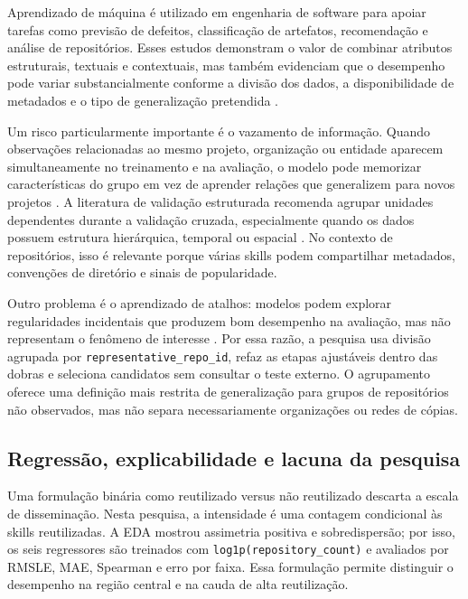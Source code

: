 Aprendizado de máquina é utilizado em engenharia de software para apoiar
tarefas como previsão de defeitos, classificação de artefatos,
recomendação e análise de repositórios. Esses estudos demonstram o valor
de combinar atributos estruturais, textuais e contextuais, mas também
evidenciam que o desempenho pode variar substancialmente conforme a
divisão dos dados, a disponibilidade de metadados e o tipo de
generalização pretendida \cite{menzies2010defect}.

Um risco particularmente importante é o vazamento de informação. Quando
observações relacionadas ao mesmo projeto, organização ou entidade
aparecem simultaneamente no treinamento e na avaliação, o modelo pode
memorizar características do grupo em vez de aprender relações que
generalizem para novos projetos \cite{kaufman2012leakage}. A literatura
de validação estruturada recomenda agrupar unidades dependentes durante
a validação cruzada, especialmente quando os dados possuem estrutura
hierárquica, temporal ou espacial \cite{saeb2017need,roberts2017cross}.
No contexto de repositórios, isso é relevante porque várias skills podem
compartilhar metadados, convenções de diretório e sinais de
popularidade.

Outro problema é o aprendizado de atalhos: modelos podem explorar
regularidades incidentais que produzem bom desempenho na avaliação, mas
não representam o fenômeno de interesse
\cite{geirhos2020shortcut,lapuschkin2019unmasking}. Por essa razão, a
pesquisa usa divisão agrupada por \texttt{representative\_repo\_id},
refaz as etapas ajustáveis dentro das dobras e seleciona candidatos sem
consultar o teste externo. O agrupamento oferece uma definição mais
restrita de generalização para grupos de repositórios não observados,
mas não separa necessariamente organizações ou redes de cópias.

\subsection{Regressão, explicabilidade e lacuna da
pesquisa}\label{regressuxe3o-explicabilidade-e-lacuna-da-pesquisa}

Uma formulação binária como reutilizado versus não reutilizado descarta
a escala de disseminação. Nesta pesquisa, a intensidade é uma contagem
condicional às skills reutilizadas. A EDA mostrou assimetria positiva e
sobredispersão; por isso, os seis regressores são treinados com
\texttt{log1p(repository\_count)} e avaliados por RMSLE, MAE, Spearman e
erro por faixa. Essa formulação permite distinguir o desempenho na
região central e na cauda de alta reutilização.

